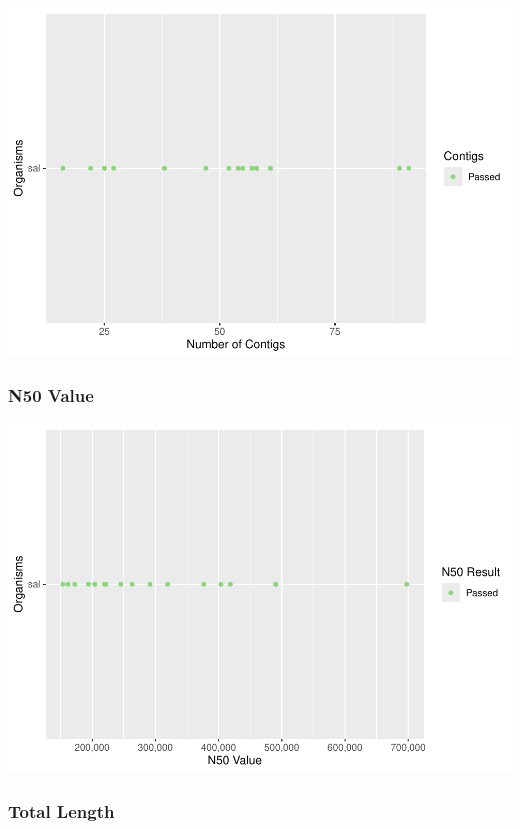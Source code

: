 \documentclass[
  a4paper,
]{article}
\begin{document}
\includegraphics{qualifyr_report_2024-07-28_files/figure-latex/unnamed-chunk-3-1.pdf}

\subsubsection{N50 Value}\label{n50-value}

\includegraphics{qualifyr_report_2024-07-28_files/figure-latex/n50_result -1.pdf}

\subsubsection{Total Length}\label{total-length}
\end{document}
